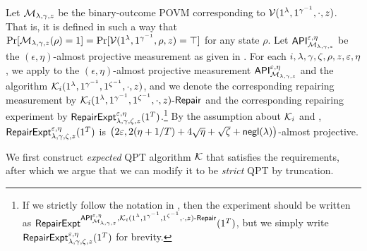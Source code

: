 Let $\mathcal{M}_{\lambda,\gamma,z}$ be the binary-outcome POVM corresponding to $\mathcal{V}(1^\lambda,1^{\gamma^{-1}},\cdot,z)$. That is, it is defined in such a way that 
$
\Pr[\mathcal{M}_{\lambda,\gamma,z}(\rho)=1]=
\Pr[\mathcal{V}(1^\lambda,1^{\gamma^{-1}},\rho,z)=\top]$
for any state $\rho$.
Let $\mathsf{API}_{\mathcal{M}_{\lambda,\gamma,z}}^{\varepsilon,\eta}$ be the $(\epsilon,\eta)$-almost projective measurement
as given in .
For each $i,\lambda,\gamma,\zeta,\rho,z,\varepsilon,\eta$, we apply  to 
the $(\epsilon,\eta)$-almost projective measurement $\mathsf{API}_{\mathcal{M}_{\lambda,\gamma,z}}^{\varepsilon,\eta}$ and
the algorithm $\mathcal{K}_i(1^\lambda,1^{\gamma^{-1}},1^{\zeta^{-1}},\cdot,z)$, 
and we denote the corresponding repairing measurement by $\mathcal{K}_i(1^\lambda,1^{\gamma^{-1}},1^{\zeta^{-1}},\cdot,z)\text{-}\mathsf{Repair}$
and the corresponding repairing experiment by $\mathsf{RepairExpt}_{\lambda,\gamma,\zeta,z}^{\varepsilon,\eta}(1^T)$.\footnote{If we strictly follow the notation in , then  the experiment should be written as $\mathsf{RepairExpt}^{\mathsf{API}_{\mathcal{M}_{\lambda,\gamma,z}}^{\varepsilon,\eta},\mathcal{K}_i(1^\lambda,1^{\gamma^{-1}},1^{\zeta^{-1}},\cdot,z)\text{-}\mathsf{Repair}}(1^T)$, but we simply write $\mathsf{RepairExpt}_{\lambda,\gamma,\zeta,z}^{\varepsilon,\eta}(1^T)$ for brevity.}
By the assumption about $\mathcal{K}_i$ and , $\mathsf{RepairExpt}_{\lambda,\gamma,\zeta,z}^{\varepsilon,\eta}(1^T)$ 
is $\big(2\varepsilon,2(\eta+1/T)+4\sqrt{\eta}+\sqrt{\zeta}+\mathsf{negl}(\lambda)\big)$-almost projective. 



We first construct \emph{expected} QPT algorithm $\mathcal{K}$ that satisfies the requirements, after which we argue that we can modify it to be \emph{strict} QPT by truncation. 

